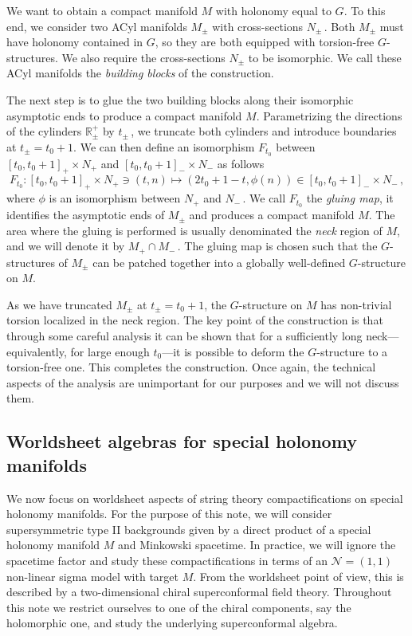 \documentclass{pspum-l}
\newcommand*\R{\mathbb{R}}
\theoremstyle{definition}
\theoremstyle{remark}
\numberwithin{equation}{section}
\begin{document}
We want to obtain a compact manifold $M$ with holonomy equal to $G$. To this end, we consider two ACyl manifolds $M_\pm$ with cross-sections $N_\pm\,$. Both $M_\pm$ must have holonomy contained in $G$, so they are both equipped with torsion-free $G$-structures. We also require the cross-sections $N_\pm$ to be isomorphic. We call these ACyl manifolds the \emph{building blocks} of the construction.

The next step is to glue the two building blocks along their isomorphic asymptotic ends to produce a compact manifold $M$. Parametrizing the directions of the cylinders $\R^+_\pm$ by $t_\pm\,$, we truncate both cylinders and introduce boundaries at $t_\pm=t_0+1$. We can then define an isomorphism $F_{t_0}$ between $\left[ t_0,t_0+1 \right]_+\times N_+$ and $\left[ t_0,t_0+1 \right]_-\times N_-$ as follows
\begin{equation}
    F_{t_0}:\left[ t_0,t_0+1 \right]_+\times N_+ \ni \left(t,n\right) \longmapsto \left(2 t_0+1-t,\phi(n)\right) \in \left[ t_0,t_0+1 \right]_-\times N_- \, ,
\end{equation}
where $\phi$ is an isomorphism between $N_+$ and $N_-\,$. We call $F_{t_0}$ the \emph{gluing map}, it identifies the asymptotic ends of $M_\pm$ and produces a compact manifold $M$. The area where the gluing is performed is usually denominated the \emph{neck} region of $M$, and we will denote it by $M_+\cap M_-\,$. The gluing map is chosen such that the $G$-structures of $M_\pm$ can be patched together into a globally well-defined $G$-structure on $M$.

As we have truncated $M_\pm$ at $t_\pm=t_0+1$, the $G$-structure on $M$ has non-trivial torsion localized in the neck region. The key point of the construction is that through some careful analysis it can be shown that for a sufficiently long neck---equivalently, for large enough $t_0$---it is possible to deform the $G$-structure to a torsion-free one. This completes the construction. Once again, the technical aspects of the analysis are unimportant for our purposes and we will not discuss them.



\subsection{Worldsheet algebras for special holonomy manifolds}

\label{sec:introAlgebras}

We now focus on worldsheet aspects of string theory compactifications on special holonomy manifolds. For the purpose of this note, we will consider supersymmetric type II backgrounds given by a direct product of a special holonomy manifold $M$ and Minkowski spacetime. In practice, we will ignore the spacetime factor and study these compactifications in terms of an $\mathcal{N}=(1,1)$ non-linear sigma model with target $M$. From the worldsheet point of view, this is described by a two-dimensional chiral superconformal field theory. Throughout this note we restrict ourselves to one of the chiral components, say the holomorphic one, and study the underlying superconformal algebra.
\end{document}
